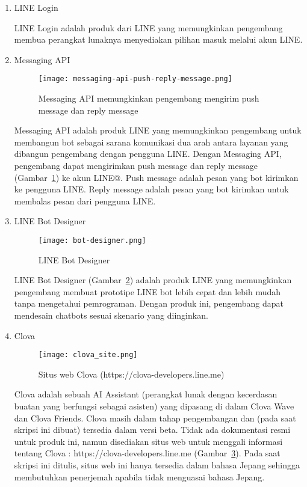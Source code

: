 \begin{enumerate}
\item LINE Login

LINE Login adalah produk dari LINE yang memungkinkan pengembang membua perangkat lunaknya menyediakan pilihan masuk melalui akun LINE.

\item Messaging API

\begin{figure}[H]
	\centering  
	\texttt{[image: messaging-api-push-reply-message.png]}  
	\caption[Push message dan reply message pada Messaging API]{Messaging API memungkinkan pengembang mengirim push message dan reply message} 
	\label{fig:messaging-api-push-reply-message} 
\end{figure}

Messaging API adalah produk LINE yang memungkinkan pengembang untuk membangun bot sebagai sarana komunikasi dua arah antara layanan yang dibangun pengembang dengan pengguna LINE. Dengan Messaging API, pengembang dapat mengirimkan push message dan reply message (Gambar~\ref{fig:messaging-api-push-reply-message}) ke akun LINE@. Push message adalah pesan yang bot kirimkan ke pengguna LINE. Reply message adalah pesan yang bot kirimkan untuk membalas pesan dari pengguna LINE.

\item LINE Bot Designer

\begin{figure}[H]
	\centering  
	\texttt{[image: bot-designer.png]}  
	\caption[LINE Bot Designer]{LINE Bot Designer} 
	\label{fig:bot-designer} 
\end{figure}

LINE Bot Designer (Gambar~\ref{fig:bot-designer}) adalah produk LINE yang memungkinkan pengembang membuat prototipe LINE bot lebih cepat dan lebih mudah tanpa mengetahui pemrograman. Dengan produk ini, pengembang dapat mendesain chatbots sesuai skenario yang diinginkan.

\item Clova

\begin{figure}[H]
	\centering  
	\texttt{[image: clova\_site.png]}  
	\caption[Situs web Clova]{Situs web Clova (https://clova-developers.line.me)} 
	\label{fig:clova_site} 
\end{figure}

Clova adalah sebuah AI Assistant (perangkat lunak dengan kecerdasan buatan yang berfungsi sebagai asisten) yang dipasang di dalam Clova Wave dan Clova Friends. Clova masih dalam tahap pengembangan dan (pada saat skripsi ini dibuat) tersedia dalam versi beta. Tidak ada dokumentasi resmi untuk produk ini, namun disediakan situs web untuk menggali informasi tentang Clova : https://clova-developers.line.me (Gambar~\ref{fig:clova_site}). Pada saat skripsi ini ditulis, situs web ini hanya tersedia dalam bahasa Jepang sehingga membutuhkan penerjemah apabila tidak menguasai bahasa Jepang.


\end{enumerate}
